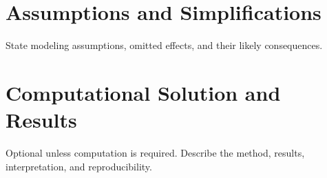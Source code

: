 \documentclass[11pt]{article}
\begin{document}
\section{Assumptions and Simplifications}
State modeling assumptions, omitted effects, and their likely consequences.

\section{Computational Solution and Results}
Optional unless computation is required. Describe the method, results, interpretation, and reproducibility.


% 
\end{document}
